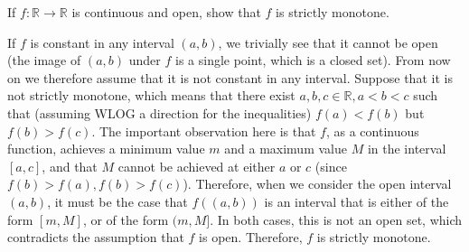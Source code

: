 \begin{exercise}{15}
    If $f: \mathbb{R} \rightarrow \mathbb{R}$ is continuous and open, show that $f$ is strictly monotone.
\end{exercise}

\begin{solution}
    
    If $f$ is constant in any interval $(a, b)$, we trivially see that it cannot be open (the image of $(a, b)$ under $f$ is a single point, which is a closed set).
    From now on we therefore assume that it is not constant in any interval.
    Suppose that it is not strictly monotone, which means that there exist $a, b, c \in \mathbb{R}, a < b < c$ such that (assuming WLOG a direction for the inequalities) $f(a) < f(b)$ but $f(b) > f(c)$.
    The important observation here is that $f$, as a continuous function, achieves a minimum value $m$ and a maximum value $M$ in the interval $[a, c]$, and that $M$ cannot be achieved at either $a$ or $c$ (since $f(b) > f(a), f(b) > f(c)$).
    Therefore, when we consider the open interval $(a, b)$, it must be the case that $f((a, b))$ is an interval that is either of the form $[m, M]$, or of the form $(m, M]$.
    In both cases, this is not an open set, which contradicts the assumption that $f$ is open.
    Therefore, $f$ is strictly monotone.
\end{solution}